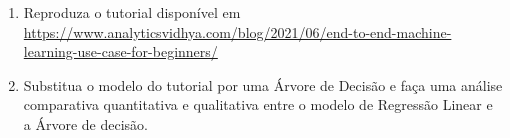 \documentclass{article}
\begin{document}
    \begin{enumerate}
        \item Reproduza o tutorial disponível em \url{https://www.analyticsvidhya.com/blog/2021/06/end-to-end-machine-learning-use-case-for-beginners/}
        \item Substitua o modelo do tutorial por uma Árvore de Decisão e faça uma análise comparativa quantitativa e qualitativa entre o modelo de Regressão Linear e a Árvore de decisão.
    \end{enumerate}

    






%
%
\end{document}
